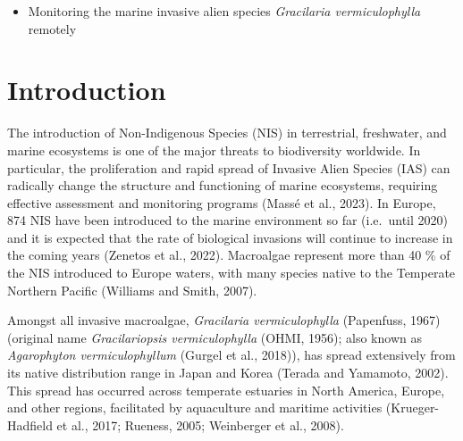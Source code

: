 \documentclass[
  letterpaper,
  DIV=11,
  numbers=noendperiod]{scrartcl}
\providecommand{\tightlist}{%
  \setlength{\itemsep}{0pt}\setlength{\parskip}{0pt}}\usepackage{longtable,booktabs,array}
\begin{document}
\begin{itemize}
\tightlist
\item
  Monitoring the marine invasive alien species \emph{Gracilaria
  vermiculophylla} remotely
\end{itemize}

\section{Introduction}\label{introduction}

The introduction of Non-Indigenous Species (NIS) in terrestrial,
freshwater, and marine ecosystems is one of the major threats to
biodiversity worldwide. In particular, the proliferation and rapid
spread of Invasive Alien Species (IAS) can radically change the
structure and functioning of marine ecosystems, requiring effective
assessment and monitoring programs (Massé et al., 2023). In Europe, 874
NIS have been introduced to the marine environment so far (i.e.~until
2020) and it is expected that the rate of biological invasions will
continue to increase in the coming years (Zenetos et al., 2022).
Macroalgae represent more than 40 \% of the NIS introduced to Europe
waters, with many species native to the Temperate Northern Pacific
(Williams and Smith, 2007).

Amongst all invasive macroalgae, \emph{Gracilaria vermiculophylla}
(Papenfuss, 1967) (original name \emph{Gracilariopsis vermiculophylla}
(OHMI, 1956); also known as \emph{Agarophyton vermiculophyllum} (Gurgel
et al., 2018)), has spread extensively from its native distribution
range in Japan and Korea (Terada and Yamamoto, 2002). This spread has
occurred across temperate estuaries in North America, Europe, and other
regions, facilitated by aquaculture and maritime activities
(Krueger-Hadfield et al., 2017; Rueness, 2005; Weinberger et al., 2008).
\end{document}
